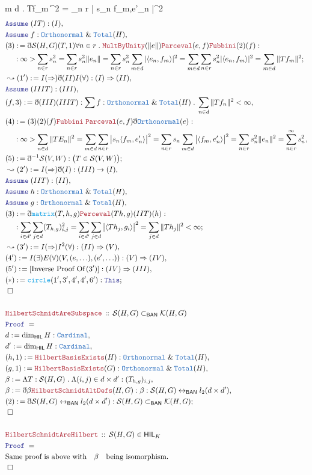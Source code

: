 \documentclass[12pt]{scrartcl}
\newcommand{\TYPE}[1]{\textcolor{NavyBlue}{\mathtt{#1}}}
\newcommand{\FUNC}[1]{\textcolor{Cerulean}{\mathtt{#1}}}
\newcommand{\LOGIC}[1]{\textcolor{Blue}{\mathtt{#1}}}
\newcommand{\THM}[1]{\textcolor{Maroon}{\mathtt{#1}}}
\renewcommand{\.}{\; . \;}
\newcommand{\de}{: \kern 0.1pc =}
\newcommand{\Theorem}[2]{& \THM{#1} \, :: \, #2 \\ & \Proof = \\ }
\newcommand{\NewLine}{\\ & \kern 1pc}
\newcommand{\Page}[1]{\begin{align*} #1 \end{align*} \newpage   }
\newcommand{ \bd }{ \ByDef }
\renewcommand{\And}{\; \& \;}
\newcommand{\ToBij}{\leftrightarrow}
\newcommand{\Say}[3]{& #1 \de #2 : #3, \\}
\newcommand{\Conclude}[3]{& #1 \de #2 : #3; \\}
\newcommand{\Derive}[3]{& \leadsto #1 \de #2 : #3, \\}
\newcommand{\A}{\LOGIC{Assume} \;}
\newcommand{\Assume}[2]{& \A #1 : #2, \\}
\newcommand{\QED}{\; \square}
\newcommand{\EndProof}{& \QED \\}
\newcommand{\ByDef}{\eth}
\newcommand{\Proof}{\LOGIC{Proof} \; }
\newcommand{\BAN}{\mathsf{BAN}} %
\newcommand{\HIL}{\mathsf{HIL}} %
\newcommand{\K}{\mathcal{K}} %
\renewcommand{\S}{\mathcal{S}}
\begin{document}
{{\forall m \in d \. \| Tf_m \|^2 = \sum_{n \in r} \big | s_n \langle f_m,e'_n \rangle \big|^2   }
} \Page{
\Assume{(IT)}{(I)}
\Assume{f}{\TYPE{Orthonormal} \And \TYPE{Total}(H)}
\Conclude{(3) }{ \bd \S(H,G)(T,1) \forall n \in r \. \THM{MultByUnity}(\| e \|)
 \THM{Parceval}(e,f) \THM{Fubbini}(2)(f)
}
{ \NewLine : 
 \infty > \sum_{n \in r} s^2_n = \sum_{n \in r} s^2_n\| e_n \| 
 = \sum_{n \in r} s^2_n \sum_{m \in d} | \langle e_n, f_m \rangle |^2  
 = \sum_{m \in d} \sum_{n \in r} s_n^2 | \langle e_n, f_m \rangle |^2 
 = \sum_{m \in d} \| Tf_m  \|^2 }
\Derive{(1')}{ I(\Rightarrow)\bd(II)I(\forall) }{(I) \Rightarrow (II)}
\Assume{(IIIT)}{(III)}
\Say{(f,3)}{ \bd (III)(IIIT)}{ \sum f : \TYPE{Orthonormal} \And \TYPE{Total}(H) 
\. \sum_{n \in d} \| Tf_n \|^2 < \infty
}
\Say{(4)}{ (3)(2)(f) \THM{Fubbini} \; \THM{Parceval}(e,f) \bd \TYPE{Orthonormal}(e)  }
{ \NewLine : \infty >
\sum_{n \in d} \| TE_n \|^2 =  \sum_{m \in d} \sum_{n \in r} \big |s_n \langle f_m, e'_n \rangle  \big|^2
 =    \sum_{n \in r  } s_n \sum_{m \in d} \big  |  \langle f_m, e'_n \rangle  \big|^2 =
  \sum_{ n \in r} s_n^2 \| e_n \|^2 = \sum^\infty_{n \in r} s^2_n }
\Conclude{(5)}{\bd^{-1}\S(V,W)}{ \big( T \in \S(V,W) \big) }
\Derive{(2')}{ I(\Rightarrow)\bd(I)}{(III) \to (I)}
\Assume{(IIT) }{(II)  }
\Assume{h}{\TYPE{Orthonormal} \And \TYPE{Total}(H)}
\Assume{g}{\TYPE{Orthonormal} \And \TYPE{Total}(H)}
\Conclude{(3) }{ \bd \FUNC{matrix}(T,h,g) \THM{Perceval}(Th,g) (IIT)(h)   }{ 
 \NewLine :
\sum_{i \in d'} \sum_{j \in d} ( T_{h,g} )_{i,j}^2 =  
 \sum_{i \in d'} \sum_{j \in d} \big| \langle Th_j,  g_i \rangle \big|^2 = 
  \sum_{j \in d} \| Th_j  \|^2 < \infty
}
\Derive{(3')}{I(\Rightarrow)I^2(\forall)}{(II)\Rightarrow (V)}
\Say{(4')}{I(\exists)E(\forall)(V, (e,\ldots),(e',\ldots))}{(V) \Rightarrow (IV)}
\Say{(5')}{[\textrm{Inverse Proof Of} \, (3')]}{(IV) \Rightarrow (III)}
\Conclude{(*)}{\FUNC{circle}(1',3',4',4', 6')}{\LOGIC{This} }
\EndProof
\\
\Theorem{HilbertSchmidtAreSubspace}{ \S(H,G) \subset_\BAN \K(H,G)}
\Say{d}{\dim_\HIL H }{\TYPE{Cardinal}}
\Say{d'}{\dim_\HIL H}{\TYPE{Cardinal}}
\Say{(h,1)}{\THM{HilbertBasisExists}(H)}{ \TYPE{Orthonormal} \And \TYPE{Total}(H) }
\Say{(g,1)}{\THM{HilbertBasisExists}(G)}{ \TYPE{Orthonormal} \And \TYPE{Total}(H) }
\Say{\beta}{\Lambda T : \S(H,G) \. \Lambda (i,j) \in d \times d' }{ (T_{h,g})_{i,j}}
\Say{\beta}{\bd \beta  \THM{HilbertSchmidtAltDefs}(H,G)}{\beta : \S(H,G) \ToBij_\BAN l_2(d \times d')}
\Conclude{(2)}{\bd \S(H,G) \ToBij_\BAN l_2(d \times d')}{ \S(H,G) \subset_\BAN \K(H,G)}
\EndProof
\\
\Theorem{HilbertSchmidtAreHilbert}{\S(H,G) \in \HIL_K}
&  \textrm{Same proof is above with} \quad \beta \quad \textrm{being isomorphism.}  \\
 \EndProof
 } 
\end{document}
